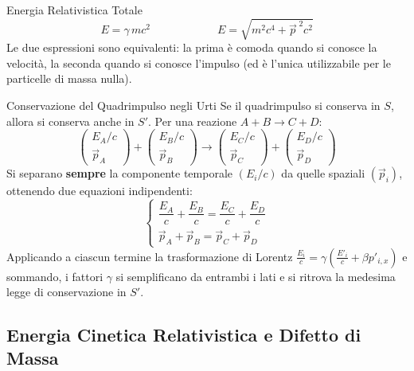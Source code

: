 \begin{formulario}{Energia Relativistica Totale}
\begin{equation}
    E = \gamma\, m c^2
    \qquad\qquad\qquad
    E = \sqrt{m^2c^4 + \vec{p}^{\;2}c^2}
\end{equation}
Le due espressioni sono equivalenti: la prima è comoda quando si conosce la velocità, la seconda quando si conosce l'impulso (ed è l'unica utilizzabile per le particelle di massa nulla).
\end{formulario}

\begin{osservazione}{Conservazione del Quadrimpulso negli Urti}
Se il quadrimpulso si conserva in $S$, allora si conserva anche in $S'$. Per una reazione $A + B \to C + D$:
\begin{equation}
    \begin{pmatrix} E_A/c \\ \vec{p}_A \end{pmatrix} + \begin{pmatrix} E_B/c \\ \vec{p}_B \end{pmatrix}
    \longrightarrow
    \begin{pmatrix} E_C/c \\ \vec{p}_C \end{pmatrix} + \begin{pmatrix} E_D/c \\ \vec{p}_D \end{pmatrix}
\end{equation}
Si separano \textbf{sempre} la componente temporale $(E_i/c)$ da quelle spaziali $(\vec{p}_i)$, ottenendo due equazioni indipendenti:
\begin{equation}
    \begin{cases}
        \dfrac{E_A}{c} + \dfrac{E_B}{c} = \dfrac{E_C}{c} + \dfrac{E_D}{c} \\[8pt]
        \vec{p}_A + \vec{p}_B = \vec{p}_C + \vec{p}_D
    \end{cases}
\end{equation}
Applicando a ciascun termine la trasformazione di Lorentz $\frac{E_i}{c} = \gamma\left(\frac{E'_i}{c} + \beta p'_{i,x}\right)$ e sommando, i fattori $\gamma$ si semplificano da entrambi i lati e si ritrova la medesima legge di conservazione in $S'$.
\end{osservazione}

\subsection{Energia Cinetica Relativistica e Difetto di Massa}

